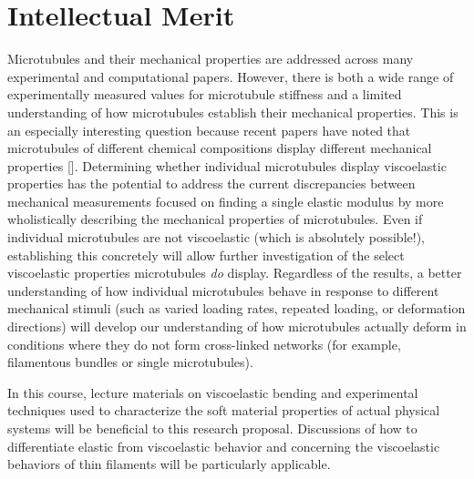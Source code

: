 \section{Intellectual Merit}
Microtubules and their mechanical properties are addressed across many experimental and computational papers. However, there is both a wide range of experimentally measured values for microtubule stiffness and a limited understanding of how microtubules establish their mechanical properties. This is an especially interesting question because recent papers have noted that microtubules of different chemical compositions display different mechanical properties [\cite{Celeg_lumen}]. Determining whether individual microtubules display viscoelastic properties has the potential to address the current discrepancies between mechanical measurements focused on finding a single elastic modulus by more wholistically describing the mechanical properties of microtubules. Even if individual microtubules are not viscoelastic (which is absolutely possible!), establishing this concretely will allow further investigation of the select viscoelastic properties microtubules \emph{do} display. Regardless of the results, a better understanding of how individual microtubules behave in response to different mechanical stimuli (such as varied loading rates, repeated loading, or deformation directions) will develop our understanding of how microtubules actually deform in conditions where they do not form cross-linked networks (for example, filamentous bundles or single microtubules). 

In this course, lecture materials on viscoelastic bending and experimental techniques used to characterize the soft material properties of actual physical systems will be beneficial to this research proposal. Discussions of how to differentiate elastic from viscoelastic behavior and concerning the viscoelastic behaviors of thin filaments will be particularly applicable.


